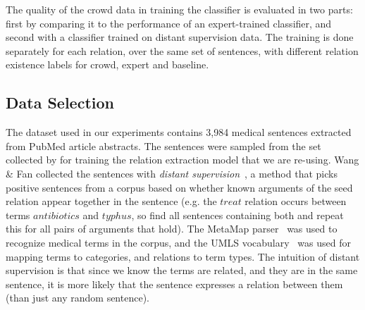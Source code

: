 The quality of the crowd data in training the classifier is evaluated in two parts: first by comparing it to the performance of an expert-trained classifier, and second with a classifier trained on distant supervision data.  The training is done separately for each relation, over the same set of sentences, with different relation existence labels for crowd, expert and baseline.


\subsection{Data Selection}

The dataset used in our experiments contains 3,984 medical sentences extracted from PubMed article abstracts. The sentences were sampled from the set collected by \cite{P14-1078} for training the relation extraction model that we are re-using. Wang \& Fan collected the sentences with {\em distant supervision}~\cite{mintz2009distant,Welty:2010:LSR}, a method that picks positive sentences from a corpus based on whether known arguments of the seed relation appear together in the sentence (e.g. the $treat$ relation occurs between terms $antibiotics$ and $typhus$, so find all sentences containing both and repeat this for all pairs of arguments that hold). The MetaMap parser~\cite{aronson2001effective} was used to recognize medical terms in the corpus, and the UMLS vocabulary~\cite{bodenreider2004unified} was used for mapping terms to categories, and relations to term types. The intuition of distant supervision is that since we know the terms are related, and they are in the same sentence, it is more likely that the sentence expresses a relation between them (than just any random sentence).


